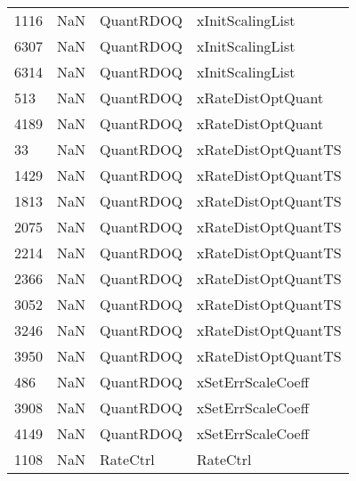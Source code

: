 \begin{tabular}{llll}
1116 &                   NaN &                  QuantRDOQ &                          xInitScalingList \\
6307 &                   NaN &                  QuantRDOQ &                          xInitScalingList \\
6314 &                   NaN &                  QuantRDOQ &                          xInitScalingList \\
513  &                   NaN &                  QuantRDOQ &                         xRateDistOptQuant \\
4189 &                   NaN &                  QuantRDOQ &                         xRateDistOptQuant \\
33   &                   NaN &                  QuantRDOQ &                       xRateDistOptQuantTS \\
1429 &                   NaN &                  QuantRDOQ &                       xRateDistOptQuantTS \\
1813 &                   NaN &                  QuantRDOQ &                       xRateDistOptQuantTS \\
2075 &                   NaN &                  QuantRDOQ &                       xRateDistOptQuantTS \\
2214 &                   NaN &                  QuantRDOQ &                       xRateDistOptQuantTS \\
2366 &                   NaN &                  QuantRDOQ &                       xRateDistOptQuantTS \\
3052 &                   NaN &                  QuantRDOQ &                       xRateDistOptQuantTS \\
3246 &                   NaN &                  QuantRDOQ &                       xRateDistOptQuantTS \\
3950 &                   NaN &                  QuantRDOQ &                       xRateDistOptQuantTS \\
486  &                   NaN &                  QuantRDOQ &                         xSetErrScaleCoeff \\
3908 &                   NaN &                  QuantRDOQ &                         xSetErrScaleCoeff \\
4149 &                   NaN &                  QuantRDOQ &                         xSetErrScaleCoeff \\
1108 &                   NaN &                   RateCtrl &                                  RateCtrl \\

\end{tabular}

